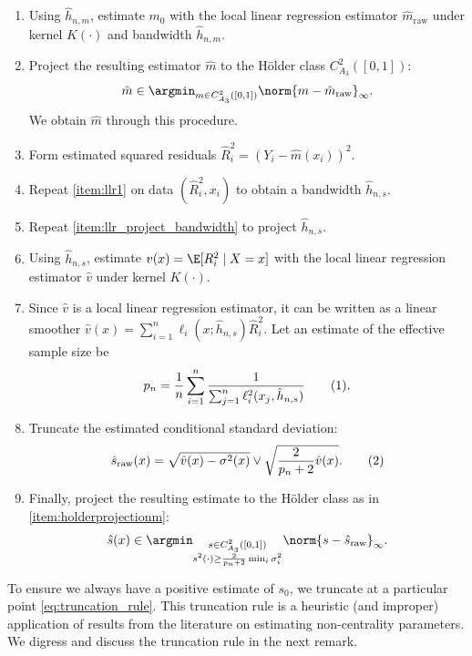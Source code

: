 \documentclass[12pt, reqno]{amsart}
\newcommand\numberthis{\addtocounter{equation}{1}\tag{\theequation}}
\newcommand{\raw}{\mathrm{raw}}
\newcommand{\hatm}{\hat m}
\newcommand{\hats}{\hat s}
\numberwithin{equation}{section}
\begin{document}
\begin{refsection}
\begin{appendices}
\begin{enumerate}[label=(LLR-\arabic*)]
  \item \label{item:hprojectionm} Using $\hat h_{n,m}$, estimate $m_0$ with the local
  linear regression estimator
  $\hatm_\raw$ under kernel $K(\cdot)$ and bandwidth $\hat h_{n,m}$.


  \item \label{item:holderprojectionm} Project the resulting estimator $\hatm$ to the
  H\"older class $C_{A_3}^2(
  [0,1])$: \[
\hatm \in \argmin_{m \in C_{A_3}^2(
  [0,1])} \norm{m - \hatm_\raw}_\infty.
  \]
  We obtain $\hatm$ through this procedure.

  \item Form estimated squared residuals $\hat R_i^2 = (Y_i - \hatm(x_i))^2$.

  \item Repeat \cref{item:llr1} on data $(\hat R_i^2, x_i)$ to obtain a bandwidth $\hat h_
  {n,s}$.

  \item \label{item:hprojections} Repeat \cref{item:llr_project_bandwidth} to project
  $\hat h_{n,s}$.
  \item Using $\hat h_{n,s}$, estimate $v(x) = \E[R_i^2 \mid X=x]$ with the local linear
  regression estimator $\hat v$ under kernel $K(\cdot)$.

  \item Since $\hat v$ is a local linear regression estimator, it can be written as a
  linear smoother $
\hat v(x) = \sum_{i=1}^n \ell_i(x; \hat h_{n,s}) \hat R_i^2.
  $
  Let an estimate of the effective sample size be \[p_n = \frac{1}{n} \sum_{i=1}^n
  \frac{1}{\sum_{j=1}^n \ell_i^2(x_j, \hat h_
  {n,s})} \numberthis \label{eq:effective_sample_size}.\]
  \item Truncate the estimated conditional standard deviation: \[
\hat s_\raw(x) = \sqrt{\hat v(x) - \sigma^2(x)} \vee \sqrt{\frac{2}{p_n+2} \hat v(x)}.
\numberthis
\label{eq:truncation_rule}
  \]
  \item \label{item:holderprojections} Finally, project the resulting estimate to the
  H\"older class as in
  \cref{item:holderprojectionm}: \[
\hat s(x) \in \argmin_{\substack{s\in C_{A_3}^2(
[0,1]) \\ s^2
(\cdot) \ge \frac{2}{p_n+2} \min_i \sigma_i^2}} \norm{s - \hats_\raw}_\infty.\]
\end{enumerate}

To ensure we always have a positive estimate of $s_0$, we truncate at a particular point
\eqref{eq:truncation_rule}. This truncation rule is a heuristic (and improper) application
of results from the literature on estimating non-centrality parameters. We digress and
discuss the truncation rule in the next remark.


\end{appendices}
\end{refsection}
\end{document}
